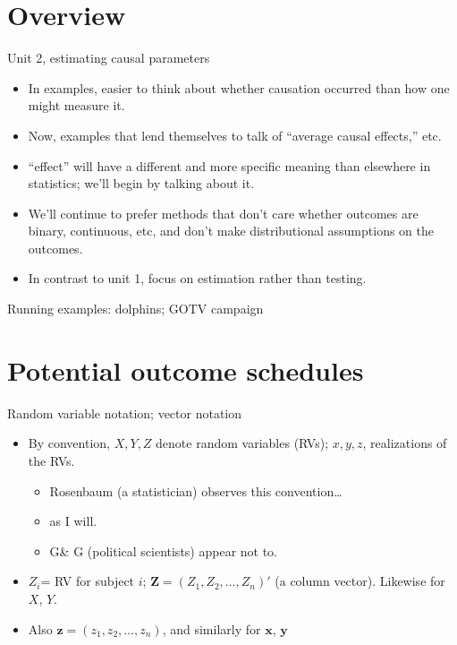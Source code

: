 \section{Overview}



\begin{frame}{Unit 2, estimating causal parameters}
  \begin{itemize}
  \item In examples, easier to think about whether causation occurred than how one might measure it.
  \item Now, examples that lend themselves to talk of ``average causal effects,'' etc.
  \item ``effect'' will have a different and more specific meaning than elsewhere in statistics; we'll begin by talking about it.
  \item We'll continue to prefer methods that don't care whether outcomes are binary, continuous, etc, and don't make distributional assumptions on the outcomes.
  \item In contrast to unit 1, focus on estimation rather than testing.
  \end{itemize}
\end{frame}

\begin{frame}{Running examples: dolphins; GOTV campaign}
  
\end{frame}

\section{Potential outcome schedules}

\begin{frame}{Random variable notation; vector notation}
  
  \begin{itemize}
  \item By convention, $X, Y, Z$ denote random variables (RVs); $x, y, z$, realizations of the RVs.
    \begin{itemize}
    \item Rosenbaum (a statistician) observes this convention\ldots
    \item as I will.
    \item G\& G (political scientists) appear not to.
    \end{itemize}
  \item $Z_i$= RV for subject $i$; $\mathbf{Z}=(Z_1, Z_2, \ldots, Z_n)'$ (a column vector).  Likewise for $X$, $Y$.
  \item Also $\mathbf{z}=(z_1, z_2, \ldots, z_n)$, and similarly for $\mathbf{x}$, $\mathbf{y}$
  \end{itemize}


\end{frame}


